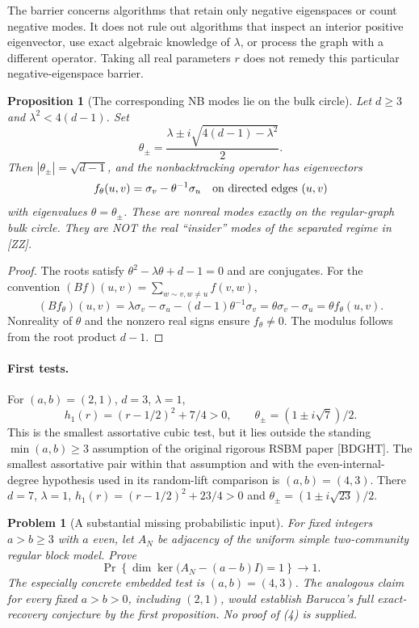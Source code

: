 \documentclass[11pt]{article}
\newtheorem{proposition}{Proposition}
\newtheorem{problem}{Problem}
\begin{document}
The barrier concerns algorithms that retain only negative eigenspaces or
count negative modes. It does not rule out algorithms that inspect an
interior positive eigenvector, use exact algebraic knowledge of $\lambda$,
or process the graph with a different operator. Taking all real parameters
$r$ does not remedy this particular negative-eigenspace barrier.

\begin{proposition}[The corresponding NB modes lie on the bulk circle]
Let $d\geq3$ and $\lambda^2<4(d-1)$. Set
\[
 \theta_\pm=\frac{\lambda\pm i\sqrt{4(d-1)-\lambda^2}}2.
\]
Then $|\theta_\pm|=\sqrt{d-1}$, and the nonbacktracking operator has
eigenvectors
\[
 f_\theta(u,v)=\sigma_v-\theta^{-1}\sigma_u
 \quad\hbox{on directed edges }(u,v)
\]
with eigenvalues $\theta=\theta_\pm$. These are nonreal modes exactly
on the regular-graph bulk circle. They are NOT the real ``insider'' modes
of the separated regime in [ZZ].
\end{proposition}
\begin{proof}
The roots satisfy $\theta^2-\lambda\theta+d-1=0$ and are conjugates.
For the convention $(Bf)(u,v)=\sum_{w\sim v,w\ne u}f(v,w)$,
\[
 (Bf_\theta)(u,v)
 =\lambda\sigma_v-\sigma_u-(d-1)\theta^{-1}\sigma_v
 =\theta\sigma_v-\sigma_u=\theta f_\theta(u,v).
\]
Nonreality of $\theta$ and the nonzero real signs ensure $f_\theta\ne0$.
The modulus follows from the root product $d-1$.
\end{proof}

\paragraph{First tests.}
For $(a,b)=(2,1)$, $d=3$, $\lambda=1$,
\[
 h_1(r)=(r-1/2)^2+7/4>0,\qquad
 \theta_\pm=(1\pm i\sqrt7)/2.
\]
This is the smallest assortative cubic test, but it lies outside the
standing $\min(a,b)\geq3$ assumption of the original rigorous RSBM paper
[BDGHT]. The smallest assortative pair within that assumption and with
the even-internal-degree hypothesis used in its random-lift comparison is
$(a,b)=(4,3)$. There $d=7$, $\lambda=1$,
$h_1(r)=(r-1/2)^2+23/4>0$ and
$\theta_\pm=(1\pm i\sqrt{23})/2$.

\begin{problem}[A substantial missing probabilistic input]
For fixed integers $a>b\geq3$ with $a$ even, let $A_N$ be adjacency
of the uniform simple two-community regular block model. Prove
\[
 \Pr\!\left\{\dim\ker\bigl(A_N-(a-b)I\bigr)=1\right\}
 \longrightarrow1.                                           \tag{4}
\]
The especially concrete embedded test is $(a,b)=(4,3)$. The analogous
claim for every fixed $a>b>0$, including $(2,1)$, would establish
Barucca's full exact-recovery conjecture by the first proposition.
No proof of (4) is supplied.
\end{problem}
\end{document}

